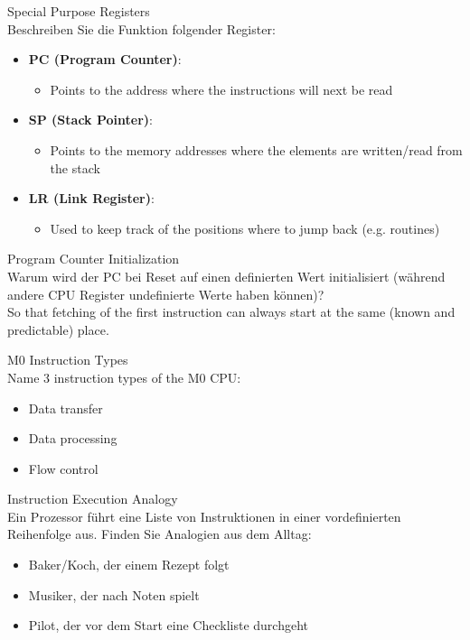 \begin{example2}{Special Purpose Registers}\\
Beschreiben Sie die Funktion folgender Register:
\begin{itemize}
  \item \textbf{PC (Program Counter)}:
    \begin{itemize}
      \item Points to the address where the instructions will next be read
    \end{itemize}
  \item \textbf{SP (Stack Pointer)}:
    \begin{itemize}
      \item Points to the memory addresses where the elements are written/read from the stack
    \end{itemize}
  \item \textbf{LR (Link Register)}:
    \begin{itemize}
      \item Used to keep track of the positions where to jump back (e.g. routines)
    \end{itemize}
\end{itemize}
\end{example2}

\begin{example2}{Program Counter Initialization}\\
Warum wird der PC bei Reset auf einen definierten Wert initialisiert (während andere CPU Register undefinierte Werte haben können)?\\
So that fetching of the first instruction can always start at the same (known and predictable) place.
\end{example2}

\begin{example2}{M0 Instruction Types}\\
Name 3 instruction types of the M0 CPU:
\begin{itemize}
  \item Data transfer
  \item Data processing
  \item Flow control
\end{itemize}
\end{example2}

\begin{example2}{Instruction Execution Analogy}\\
Ein Prozessor führt eine Liste von Instruktionen in einer vordefinierten Reihenfolge aus. Finden Sie Analogien aus dem Alltag:
\begin{itemize}
  \item Baker/Koch, der einem Rezept folgt
  \item Musiker, der nach Noten spielt
  \item Pilot, der vor dem Start eine Checkliste durchgeht
\end{itemize}
\end{example2}







